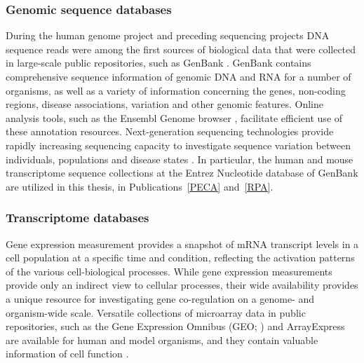 \subsubsection{Genomic sequence databases}

During the human genome project and preceding sequencing projects DNA
sequence reads were among the first sources of biological data that
were collected in large-scale public repositories, such as GenBank
\citep{Benson2010}. GenBank contains comprehensive sequence
information of genomic DNA and RNA for a number of organisms, as well
as a variety of information concerning the genes, non-coding regions,
disease associations, variation and other genomic features. Online
analysis tools, such as the Ensembl Genome browser \citep{Flicek2010},
facilitate efficient use of these annotation
resources. Next-generation sequencing technologies provide rapidly
increasing sequencing capacity to investigate sequence variation
between individuals, populations and disease states
\citep{Ledford2010, McPherson2009}. In particular, the human and mouse
transcriptome sequence collections at the Entrez Nucleotide database
of GenBank are utilized in this thesis, in Publications~\ref{PECA}
and~\ref{RPA}.

\subsubsection{Transcriptome databases}

Gene expression measurement provides a snapshot of mRNA transcript
levels in a cell population at a specific time and condition,
reflecting the activation patterns of the various cell-biological
processes. While gene expression measurements provide only an indirect
view to cellular processes, their wide availability provides a unique
resource for investigating gene co-regulation on a genome- and
organism-wide scale. Versatile collections of microarray data in
public repositories, such as the Gene Expression Omnibus (GEO;
\cite{Barrett2009}) and ArrayExpress \citep{Parkinson2009} are
available for human and model organisms, and they contain valuable
information of cell function \citep{Carninci05, DeRisi97, Russ10,
  Zhang04b}.

